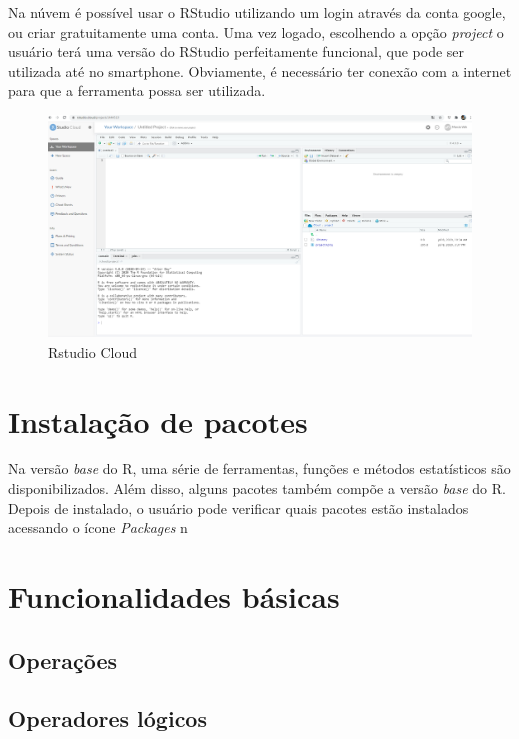 \documentclass[
]{book}
\theoremstyle{definition}
\theoremstyle{definition}
\theoremstyle{definition}
\theoremstyle{remark}
\begin{document}
Na núvem é possível usar o RStudio utilizando um login através da conta google, ou criar gratuitamente uma conta. Uma vez logado, escolhendo a opção \emph{project} o usuário terá uma versão do RStudio perfeitamente funcional, que pode ser utilizada até no smartphone. Obviamente, é necessário ter conexão com a internet para que a ferramenta possa ser utilizada.

\begin{figure}
\includegraphics[width=0.9\linewidth]{Figuras/RStudioCloud2} \caption{Rstudio Cloud}\label{fig:rstudiocloud2}
\end{figure}

\hypertarget{instalauxe7uxe3o-de-pacotes}{%
\section{Instalação de pacotes}\label{instalauxe7uxe3o-de-pacotes}}

Na versão \emph{base} do R, uma série de ferramentas, funções e métodos estatísticos são disponibilizados. Além disso, alguns pacotes também compõe a versão \emph{base} do R. Depois de instalado, o usuário pode verificar quais pacotes estão instalados acessando o ícone \emph{Packages} n

\hypertarget{funcionalidades-buxe1sicas}{%
\section{Funcionalidades básicas}\label{funcionalidades-buxe1sicas}}

\hypertarget{operauxe7uxf5es}{%
\subsection{Operações}\label{operauxe7uxf5es}}

\hypertarget{operadores-luxf3gicos}{%
\subsection{Operadores lógicos}\label{operadores-luxf3gicos}}
\end{document}
